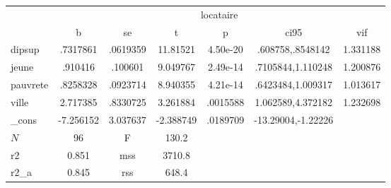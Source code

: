{
\begin{tabular}{l*{1}{cccccc}}
\toprule
            &\multicolumn{6}{c}{locataire}                                                \\
            &           b&          se&           t&           p&        ci95&         vif\\
\midrule
dipsup      &    .7317861&    .0619359&    11.81521&    4.50e-20&.608758,.8548142&    1.331188\\
jeune       &     .910416&     .100601&    9.049767&    2.49e-14&.7105844,1.110248&    1.200876\\
pauvrete    &    .8258328&    .0923714&    8.940355&    4.21e-14&.6423484,1.009317&    1.013617\\
ville       &    2.717385&    .8330725&    3.261884&    .0015588&1.062589,4.372182&    1.232698\\
\_cons      &   -7.256152&    3.037637&   -2.388749&    .0189709&-13.29004,-1.22226&            \\
\midrule
\(N\)       &          96&  F           &       130.2   &            &            &            \\
r2          &       0.851&    mss         &      3710.8     &            &            &            \\
r2\_a        &       0.845&  rss         &       648.4   &            &            &            \\
\bottomrule
\end{tabular}
}
